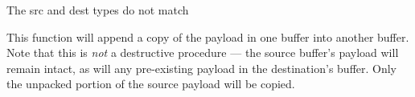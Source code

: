 \returnstart
\begin{constantdesc}
\item {} The src and dest  types do not match
\end{constantdesc}
\returnend

\descr

This function will append a copy of the payload in one buffer into another buffer. Note that this is \textit{not} a destructive procedure --- the source buffer's payload will remain intact, as will any pre-existing payload in the destination's buffer. Only the unpacked portion of the source payload will be copied.


